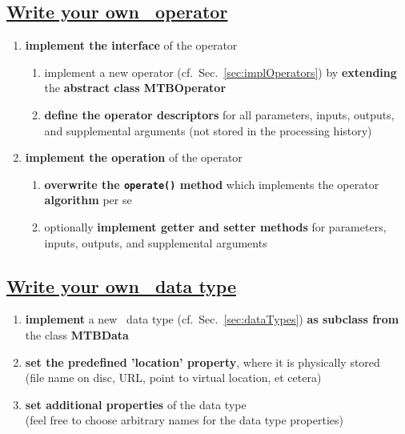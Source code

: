 \subsection*{\underline{Write your own \mitobo\ operator}}
\begin{enumerate}
 \item \textbf{implement the interface} of the operator
 \begin{enumerate}
  \item implement a new operator (cf.~Sec.~\ref{sec:implOperators}) by
        \textbf{extending} the \textbf{abstract class MTBOperator}
  \item \textbf{define the operator descriptors} for all parameters,
        inputs, outputs, and supplemental arguments (not stored in the
        processing history)
 \end{enumerate}
\item \textbf{implement the operation} of the operator
 \begin{enumerate}
  \item \textbf{overwrite the \lstinline+operate()+ method} which implements
	the operator \textbf{algorithm} per se
  \item optionally \textbf{implement getter and setter methods} for 
        parameters, inputs, outputs, and supplemental arguments
 \end{enumerate}
\end{enumerate}

\subsection*{\underline{Write your own \mitobo\ data type}}
 \begin{enumerate}
  \item \textbf{implement} a new \mitobo\ data type
        (cf.~Sec.~\ref{sec:dataTypes}) \textbf{as subclass from} the class
        \textbf{MTBData}
  \item \textbf{set the predefined ’location’ property}, where it is physically
        stored\\
        (file name on disc, URL, point to virtual location, et cetera)
  \item \textbf{set additional properties} of the data type\\
   (feel free to choose arbitrary names for the data type properties)
 \end{enumerate}

